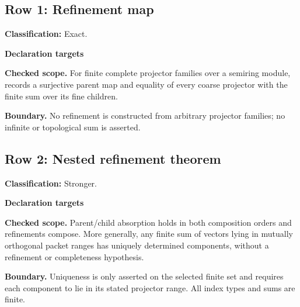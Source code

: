 \subsection{Row 1: Refinement map}
\label{row:1}
\textbf{Classification:} Exact.
\par\smallskip\textbf{Declaration targets}\par
{\small\noindent{}\par}
{\small\noindent{}\par}
{\small\noindent{}\par}
\smallskip\textbf{Checked scope.} For finite complete projector families over a semiring module,  records a surjective parent map and equality of every coarse projector with the finite sum over its fine children.
\par\smallskip\textbf{Boundary.} No refinement is constructed from arbitrary projector families; no infinite or topological sum is asserted.
\medskip
{}
\subsection{Row 2: Nested refinement theorem}
\label{row:2}
\textbf{Classification:} Stronger.
\par\smallskip\textbf{Declaration targets}\par
{\small\noindent{}\par}
{\small\noindent{}\par}
{\small\noindent{}\par}
{\small\noindent{}\par}
{\small\noindent{}\par}
{\small\noindent{}\par}
{\small\noindent{}\par}
{\small\noindent{}\par}
{\small\noindent{}\par}
\smallskip\textbf{Checked scope.} Parent/child absorption holds in both composition orders and refinements compose. More generally, any finite sum of vectors lying in mutually orthogonal packet ranges has uniquely determined components, without a refinement or completeness hypothesis.
\par\smallskip\textbf{Boundary.} Uniqueness is only asserted on the selected finite set and requires each component to lie in its stated projector range. All index types and sums are finite.
\medskip
{}
